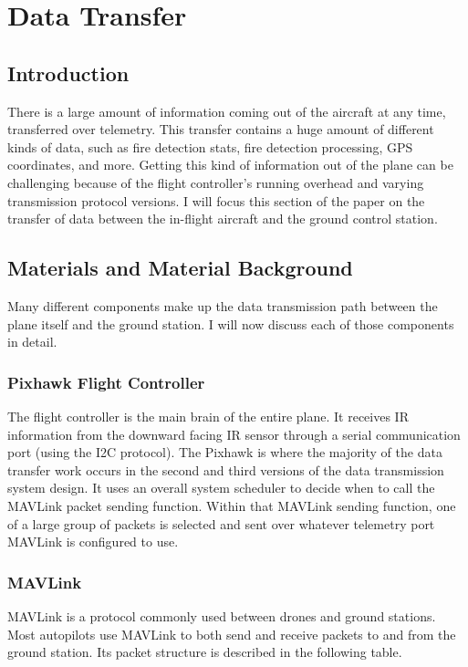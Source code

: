 \documentclass[12pt,journal,compsoc]{IEEEtran}
\begin{document}
\section{Data Transfer}
\subsection{Introduction}
There is a large amount of information coming out of the aircraft at any time, transferred over telemetry. This transfer contains a huge amount of different kinds of data, such as fire detection stats, fire detection processing, GPS coordinates, and more. Getting this kind of information out of the plane can be challenging because of the flight controller's running overhead and varying transmission protocol versions. I will focus this section of the paper on the transfer of data between the in-flight aircraft and the ground control station.

\subsection{Materials and Material Background}
Many different components make up the data transmission path between the plane itself and the ground station. I will now discuss each of those components in detail.

\subsubsection{Pixhawk Flight Controller}
The flight controller is the main brain of the entire plane. It receives IR information from the downward facing IR sensor through a serial communication port (using the I2C protocol). The Pixhawk is where the majority of the data transfer work occurs in the second and third versions of the data transmission system design. It uses an overall system scheduler to decide when to call the MAVLink packet sending function. Within that MAVLink sending function, one of a large group of packets is selected and sent over whatever telemetry port MAVLink is configured to use.

\subsubsection{MAVLink}
MAVLink is a protocol commonly used between drones and ground stations. Most autopilots use MAVLink to both send and receive packets to and from the ground station. Its packet structure is described in the following table.
\end{document}
